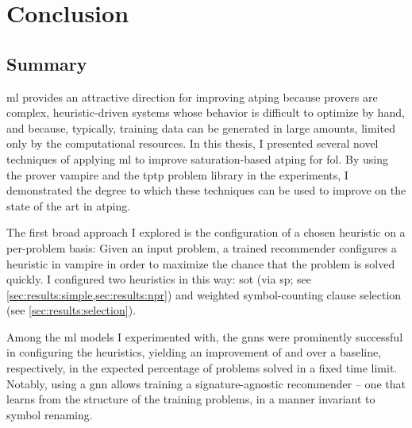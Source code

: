 \chapter{Conclusion}



\section{Summary}

\Gls{ml} provides an attractive direction for improving \gls{atping} because provers are complex, heuristic-driven systems whose behavior is difficult to optimize by hand,
and because, typically, training data can be generated in large amounts, limited only by the computational resources.
In this thesis,
I presented several novel techniques of applying \gls{ml} to improve saturation-based \gls{atping} for \gls{fol}.
By using the prover \gls{vampire} and the \gls{tptp} problem library in the experiments,
I demonstrated the degree to which these techniques can be used to improve on the state of the art in \gls{atping}.

The first broad approach I explored is the configuration of a chosen heuristic on a per-problem basis:
Given an input problem, a trained recommender configures a heuristic in \gls{vampire} in order to maximize the chance that the problem is solved quickly.
I configured two heuristics in this way:
\gls{sot} (via \gls{sp}; see \cref{sec:results:simple,sec:results:npr}) and weighted symbol-counting clause selection (see \cref{sec:results:selection}).

Among the \gls{ml} models I experimented with,
the \glspl{gnn} were prominently successful in configuring the heuristics,
yielding an improvement of  and  over a baseline, respectively, in the expected percentage of problems solved in a fixed time limit.
Notably, using a \gls{gnn} allows training a signature-agnostic recommender -- one that learns from the structure of the training problems, in a manner invariant to symbol renaming.

